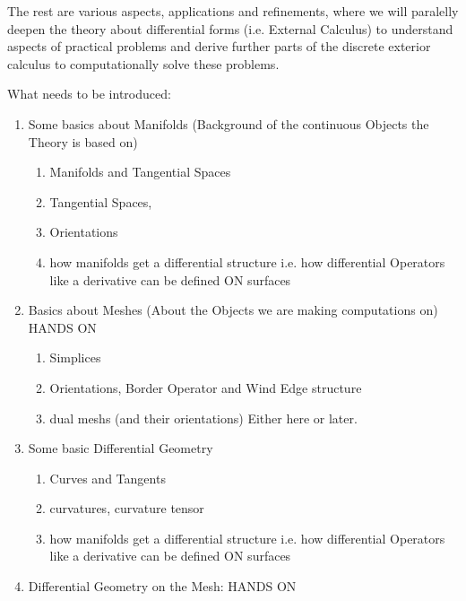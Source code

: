 The rest are various aspects, applications and refinements, where we will paralelly deepen the theory about differential forms (i.e. External Calculus) to understand aspects of practical problems and derive further parts of the discrete exterior calculus to computationally solve these problems.




What needs to be introduced:
\begin{enumerate}
\item Some basics about Manifolds (Background of the continuous Objects the Theory is based on)
	\begin{enumerate}
		\item Manifolds and Tangential Spaces
		\item Tangential Spaces, 
		\item Orientations
		\item how manifolds get a differential structure i.e. how differential Operators like a derivative can be defined ON surfaces
	\end{enumerate}
\item Basics about Meshes (About the Objects we are making computations on) HANDS ON
	\begin{enumerate}
		\item Simplices
		\item Orientations, Border Operator and Wind Edge structure
		\item dual meshs (and their orientations) Either here or later.
	\end{enumerate}
\item Some basic Differential Geometry
	\begin{enumerate}
		\item Curves and Tangents
		\item curvatures, curvature tensor
		\item how manifolds get a differential structure i.e. how differential Operators like a derivative can be defined ON surfaces
	\end{enumerate}
\item Differential Geometry on the Mesh: HANDS ON
	\begin{enumerate}

\end{enumerate}
\end{enumerate}

